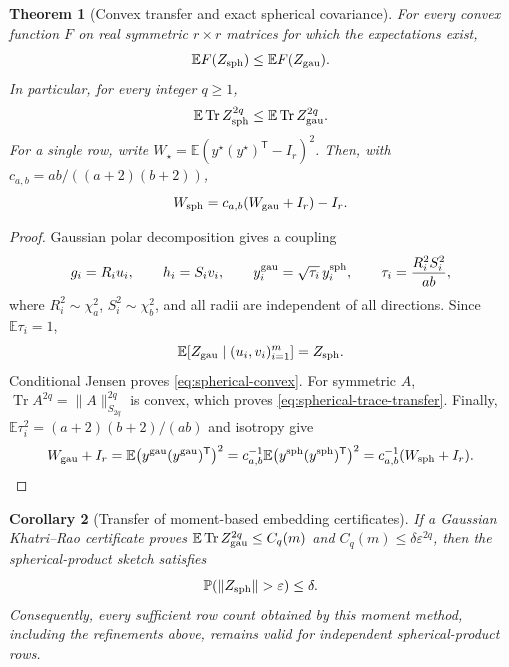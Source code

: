 \documentclass[11pt,a4paper]{article}
\newtheorem{theorem}{Theorem}[section]
\newtheorem{corollary}[theorem]{Corollary}
\theoremstyle{definition}\newtheorem{definition}[theorem]{Definition}
\theoremstyle{remark}\newtheorem{remark}[theorem]{Remark}
\numberwithin{equation}{section}
\begin{document}
\begin{theorem}[Convex transfer and exact spherical covariance]
\label{thm:spherical-transfer}
For every convex function $F$ on real symmetric $r\times r$ matrices
for which the expectations exist,
\begin{equation}\label{eq:spherical-convex}
 \mathbb E F(Z_{\rm sph})\le \mathbb E F(Z_{\rm gau}).
\end{equation}
In particular, for every integer $q\ge1$,
\begin{equation}\label{eq:spherical-trace-transfer}
 \mathbb E\operatorname{Tr}Z_{\rm sph}^{2q}
 \le \mathbb E\operatorname{Tr}Z_{\rm gau}^{2q}.
\end{equation}
For a single row, write
$W_{\star}=\mathbb E(y^{\star}(y^{\star})^{\mathsf T}-I_r)^2$.
Then, with $c_{a,b}=ab/((a+2)(b+2))$,
\begin{equation}\label{eq:spherical-covariance}
 W_{\rm sph}=c_{a,b}(W_{\rm gau}+I_r)-I_r.
\end{equation}
\end{theorem}

\begin{proof}
Gaussian polar decomposition gives a coupling
\[
 g_i=R_i u_i,\qquad h_i=S_i v_i,\qquad
 y_i^{\rm gau}=\sqrt{\tau_i}\,y_i^{\rm sph},\qquad
 \tau_i=\frac{R_i^2S_i^2}{ab},
\]
where $R_i^2\sim\chi_a^2$, $S_i^2\sim\chi_b^2$, and all radii are
independent of all directions.  Since $\mathbb E\tau_i=1$,
\[
 \mathbb E[Z_{\rm gau}\mid (u_i,v_i)_{i=1}^m]=Z_{\rm sph}.
\]
Conditional Jensen proves \eqref{eq:spherical-convex}.  For symmetric
$A$, $\operatorname{Tr}A^{2q}=\|A\|_{S_{2q}}^{2q}$ is convex,
which proves \eqref{eq:spherical-trace-transfer}.  Finally,
$\mathbb E\tau_i^2=(a+2)(b+2)/(ab)$ and isotropy give
\[
 W_{\rm gau}+I_r
 =\mathbb E\bigl(y^{\rm gau}(y^{\rm gau})^{\mathsf T}\bigr)^2
 =c_{a,b}^{-1}
   \mathbb E\bigl(y^{\rm sph}(y^{\rm sph})^{\mathsf T}\bigr)^2
 =c_{a,b}^{-1}(W_{\rm sph}+I_r).
\]
\end{proof}

\begin{corollary}[Transfer of moment-based embedding certificates]
\label{cor:spherical-ose}
If a Gaussian Khatri--Rao certificate proves
$\mathbb E\operatorname{Tr}Z_{\rm gau}^{2q}\le C_q(m)$ and
$C_q(m)\le\delta\varepsilon^{2q}$, then the spherical-product sketch
satisfies
\[
 \mathbb P(\|Z_{\rm sph}\|>\varepsilon)\le\delta.
\]
Consequently, every sufficient row count obtained by this moment method,
including the refinements above, remains valid for independent
spherical-product rows.
\end{corollary}
\end{document}
